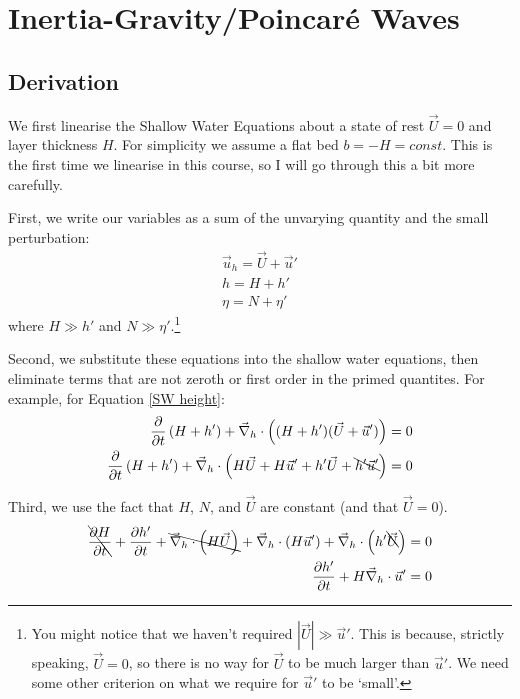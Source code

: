 \section{Inertia-Gravity/Poincaré Waves}\label{2D Poincare}

\subsection{Derivation}

We first linearise the Shallow Water Equations about a state of rest \(\vec{U}=0\) and layer thickness \(H\). For simplicity we assume a flat bed \(b=-H=const\). This is the first time we linearise in this course, so I will go through this a bit more carefully.

First, we write our variables as a sum of the unvarying quantity and the small perturbation:
\begin{align*}
    \vec{u}_h=\vec{U}+\vec{u}'\\
    h = H + h'\\
    \eta = N + \eta'
\end{align*}
where \(H\gg h'\) and \(N\gg \eta'\).\footnote{
    You might notice that we haven't required \(|\vec{U}|\gg \vec{u}'\). This is because, strictly speaking, \(\vec{U}=0\), so there is no way for \(\vec{U}\) to be much larger than \(\vec{u}'\). We need some other criterion on what we require for \(\vec{u}'\) to be `small'.
}

Second, we substitute these equations into the shallow water equations, then eliminate terms that are not zeroth or first order in the primed quantites. For example, for Equation \ref{SW height}:
\begin{align*}
    \frac{\partial}{\partial t}\left( H+h' \right)+\vec{\nabla}_h\cdot \left( (H+h')(\vec{U}+\vec{u}') \right)=0\\
    \frac{\partial}{\partial t}\left( H+h' \right)+\vec{\nabla}_h\cdot \left( H\vec{U}+H\vec{u}'+h'\vec{U}+\bcancel{h'\vec{u}'} \right)=0
\end{align*}

Third, we use the fact that \(H\), \(N\), and \(\vec{U}\) are constant (and that \(\vec{U}=0\)).
\begin{align*}
    \bcancel{\frac{\partial H}{\partial t}}+ \frac{\partial h'}{\partial t}+\bcancel{\vec{\nabla}_h\cdot \left( H\vec{U} \right)}+\vec{\nabla}_h\cdot \left(H\vec{u}'\right)+\vec{\nabla}_h\cdot \left(h'\bcancel{\vec{U}} \right)=0\\
    \frac{\partial h'}{\partial t}+H\vec{\nabla}_h\cdot\vec{u}'=0
\end{align*}

